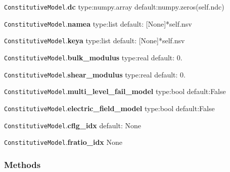 \documentclass[11pt]{article}
\begin{document}
\begin{description}
  \item{\texttt{ConstitutiveModel}.\textbf{dc}} \newline
  type:numpy.array\newline
  default:numpy.zeros(self.ndc)

  \item{\texttt{ConstitutiveModel}.\textbf{namea}} \newline
  type:list\newline
  default: [None]*self.nsv

  \item{\texttt{ConstitutiveModel}.\textbf{keya}} \newline
  type:list\newline
  default: [None]*self.nsv

  \item{\texttt{ConstitutiveModel}.\textbf{bulk\_modulus}} \newline
  type:real\newline
  default: 0.

  \item{\texttt{ConstitutiveModel}.\textbf{shear\_modulus}} \newline
  type:real\newline
  default: 0.

  \item{\texttt{ConstitutiveModel}.\textbf{multi\_level\_fail\_model}} \newline
  type:bool\newline
  default:False

  \item{\texttt{ConstitutiveModel}.\textbf{electric\_field\_model}} \newline
  type:bool\newline
  default:False

  \item{\texttt{ConstitutiveModel}.\textbf{cflg\_idx}}
  default: None

  \item{\texttt{ConstitutiveModel}.\textbf{fratio\_idx}} \newline
  None

\end{description}

\subsubsection{Methods}
\end{document}
